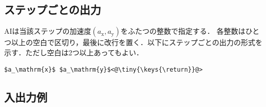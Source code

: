 \documentclass[11pt]{jarticle}
\begin{document}
\subsection{ステップごとの出力}\label{sec:output_step}
AIは当該ステップの加速度$(a_\mathrm{x},a_\mathrm{y})$をふたつの整数で指定する．
各整数はひとつ以上の空白で区切り，最後に改行を置く．以下にステップごとの出力の形式を示す．ただし空白は2つ以上あってもよい．

\begin{lstlisting}
$a_\mathrm{x}$ $a_\mathrm{y}$<@\tiny{\keys{\return}}@>
\end{lstlisting}

\subsection{入出力例}
\end{document}
